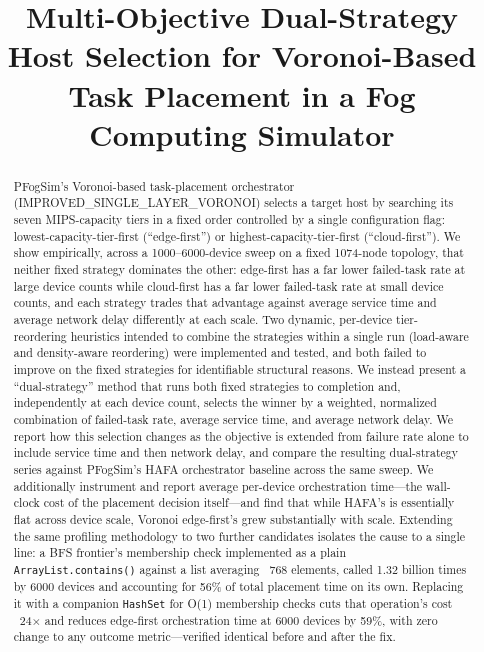 \documentclass[10pt,conference]{IEEEtran}
\begin{document}
\title{Multi-Objective Dual-Strategy Host Selection for Voronoi-Based Task Placement in a Fog Computing Simulator}

\author{
}

\maketitle

\begin{abstract}
PFogSim's Voronoi-based task-placement orchestrator (IMPROVED\_SINGLE\_LAYER\_VORONOI) selects a target host by searching its seven MIPS-capacity tiers in a fixed order controlled by a single configuration flag: lowest-capacity-tier-first (``edge-first'') or highest-capacity-tier-first (``cloud-first''). We show empirically, across a 1000--6000-device sweep on a fixed 1074-node topology, that neither fixed strategy dominates the other: edge-first has a far lower failed-task rate at large device counts while cloud-first has a far lower failed-task rate at small device counts, and each strategy trades that advantage against average service time and average network delay differently at each scale. Two dynamic, per-device tier-reordering heuristics intended to combine the strategies within a single run (load-aware and density-aware reordering) were implemented and tested, and both failed to improve on the fixed strategies for identifiable structural reasons. We instead present a ``dual-strategy'' method that runs both fixed strategies to completion and, independently at each device count, selects the winner by a weighted, normalized combination of failed-task rate, average service time, and average network delay. We report how this selection changes as the objective is extended from failure rate alone to include service time and then network delay, and compare the resulting dual-strategy series against PFogSim's HAFA orchestrator baseline across the same sweep. We additionally instrument and report average per-device orchestration time---the wall-clock cost of the placement decision itself---and find that while HAFA's is essentially flat across device scale, Voronoi edge-first's grew substantially with scale. Extending the same profiling methodology to two further candidates isolates the cause to a single line: a BFS frontier's membership check implemented as a plain \texttt{ArrayList.contains()} against a list averaging ~768 elements, called 1.32 billion times by 6000 devices and accounting for 56\% of total placement time on its own. Replacing it with a companion \texttt{HashSet} for O(1) membership checks cuts that operation's cost ~24$\times$ and reduces edge-first orchestration time at 6000 devices by 59\%, with zero change to any outcome metric---verified identical before and after the fix.
\end{abstract}
\end{document}
